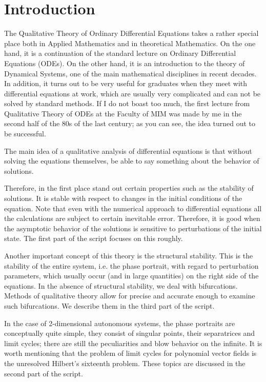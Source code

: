 \chapter*{Introduction}

The Qualitative Theory of Ordinary Differential Equations takes a rather special place both in Applied Mathematics and in theoretical Mathematics. On the one hand, it is a continuation of the standard lecture on Ordinary Differential Equations (ODEs). On the other hand, it is an introduction to the theory of Dynamical Systems, one of the main mathematical disciplines in recent decades. In addition, it turns out to be very useful for graduates when they meet with differential equations at work, which are usually very complicated and can not be solved by standard methods. If I do not boast too much, the first lecture from Qualitative Theory of ODEs at the Faculty of MIM was made by me in the second half of the 80s of the last century; as you can see, the idea turned out to be successful.

The main idea of a qualitative analysis of differential equations is that without solving the equations themselves, be able to say something about the behavior of solutions.

Therefore, in the first place stand out certain properties such as the stability of solutions. It is stable with respect to changes in the initial conditions of the equation. Note that even with the numerical approach to differential equations all the calculations are subject to certain inevitable error. Therefore, it is good when the asymptotic behavior of the solutions is sensitive to perturbations of the initial state. The first part of the script focuses on this roughly.

Another important concept of this theory is the structural stability. This is the stability of the entire system, i.e. the phase portrait, with regard to perturbation parameters, which usually occur (and in large quantities) on the right side of the equations. In the absence of structural stability, we deal with bifurcations. Methods of qualitative theory allow for precise and accurate enough to examine such bifurcations. We describe them in the third part of the script.

In the case of 2-dimensional autonomous systems, the phase portraits are conceptually quite simple, they consist of singular points, their separatrices and limit cycles;  there are still the peculiarities and blow behavior on the infinite. It is worth mentioning that the problem of limit cycles for polynomial vector fields is the unresolved Hilbert's sixteenth problem. These topics are discussed in the second part of the script.

